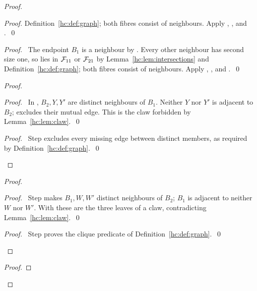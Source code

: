 \begin{mergedproofsection}
\begin{proof}
\begin{proof}
  Definition~\ref{hc:def:graph}; both fibres consist of neighbours.
  Apply , , and
  .~\qed\end{proof}
 \begin{proof}\pf\ The endpoint $B_1$ is a neighbour by .
  Every other neighbour has second size one, so lies in ${\mathcal F}_{11}$
  or ${\mathcal F}_{21}$ by Lemma~\ref{hc:lem:intersections} and
  Definition~\ref{hc:def:graph}; both fibres consist of neighbours.
  Apply , , and
  .~\qed\end{proof}
 \begin{proof}
  \begin{proof}\pf\ In , $B_2,Y,Y'$ are
   distinct neighbours of $B_1$. Neither $Y$ nor $Y'$ is adjacent
   to $B_2$;  excludes their mutual edge. This is the claw
   forbidden by Lemma~\ref{hc:lem:claw}.~\qed\end{proof}
  \qedstep
  \begin{proof}\pf\ Step  excludes every
   missing edge between distinct members, as required by
   Definition~\ref{hc:def:graph}.~\qed\end{proof}
 \end{proof}
 \begin{proof}
  \begin{proof}\pf\ Step  makes
   $B_1,W,W'$ distinct neighbours of $B_2$; $B_1$ is adjacent to
   neither $W$ nor $W'$. With  these are the three leaves
   of a claw, contradicting Lemma~\ref{hc:lem:claw}.~\qed\end{proof}
  \qedstep
  \begin{proof}\pf\ Step  proves the clique
   predicate of Definition~\ref{hc:def:graph}.~\qed\end{proof}
 \end{proof}
 \begin{proof}
\end{proof}
\end{proof}
\end{mergedproofsection}

